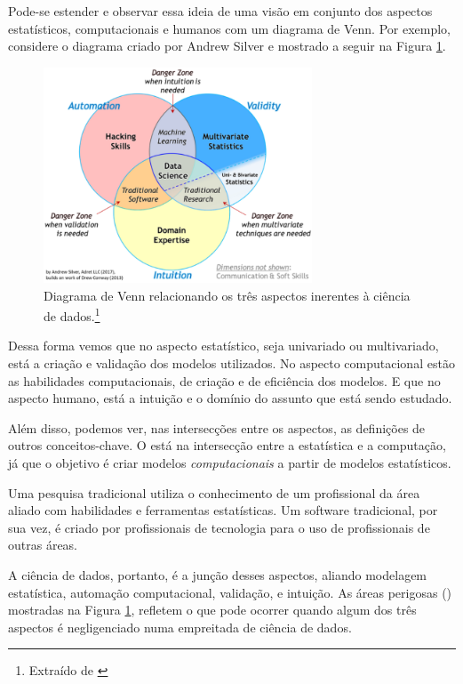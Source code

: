Pode-se estender e observar essa ideia de uma visão em conjunto dos aspectos estatísticos, computacionais e humanos com um diagrama de Venn. Por exemplo, considere o diagrama criado por Andrew Silver \citep{venn} e mostrado a seguir na Figura \ref{fig:venn}.

\begin{figure}[htb]
\centering
\includegraphics[width=8cm]{figuras/venn}
\caption{Diagrama de Venn relacionando os três aspectos inerentes à ciência de dados.\footnote{Extraído de \citep{venn}}}
\label{fig:venn}
\end{figure}

Dessa forma vemos que no aspecto estatístico, seja univariado ou multivariado, está a criação e validação dos modelos utilizados. No aspecto computacional estão as habilidades computacionais, de criação e de eficiência dos modelos. E que no aspecto humano, está a intuição e o domínio do assunto que está sendo estudado.

Além disso, podemos ver, nas intersecções entre os aspectos, as definições de outros conceitos-chave. O  está na intersecção entre a estatística e a computação, já que o objetivo é criar modelos \emph{computacionais} a partir de modelos estatísticos. 

Uma pesquisa tradicional utiliza o conhecimento de um profissional da área aliado com habilidades e ferramentas estatísticas. Um software tradicional, por sua vez, é criado por profissionais de tecnologia para o uso de profissionais de outras áreas. 

A ciência de dados, portanto, é a junção desses aspectos, aliando modelagem estatística, automação computacional, validação, e intuição. As áreas perigosas () mostradas na Figura \ref{fig:venn}, refletem o que pode ocorrer quando algum dos três aspectos é negligenciado numa empreitada de ciência de dados.

